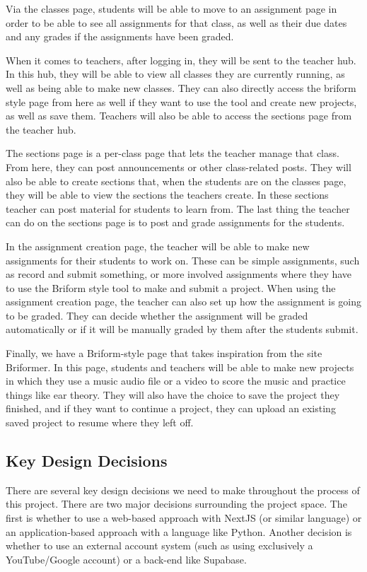 \documentclass[12pt, letterpaper]{article}
\begin{document}
Via the classes page, students will be able to move to an assignment page in order to be able to see all assignments for that class, as well as their due dates and any grades if the assignments have been graded.

When it comes to teachers, after logging in, they will be sent to the teacher hub. In this hub, they will be able to view all classes they are currently running, as well as being able to make new classes. They can also directly access the briform style page from here as well if they want to use the tool and create new projects, as well as save them. Teachers will also be able to access the sections page from the teacher hub.

The sections page is a per-class page that lets the teacher manage that class. From here, they can post announcements or other class-related posts. They will also be able to create sections that, when the students are on the classes page, they will be able to view the sections the teachers create. In these sections teacher can post material for students to learn from. The last thing the teacher can do on the sections page is to post and grade assignments for the students.

In the assignment creation page, the teacher will be able to make new assignments for their students to work on. These can be simple assignments, such as record and submit something, or more involved assignments where they have to use the Briform style tool to make and submit a project. When using the assignment creation page, the teacher can also set up how the assignment is going to be graded. They can decide whether the assignment will be graded automatically or if it will be manually graded by them after the students submit.

Finally, we have a Briform-style page that takes inspiration from the site Briformer. In this page, students and teachers will be able to make new projects in which they use a music audio file or a video to score the music and practice things like ear theory. They will also have the choice to save the project they finished, and if they want to continue a project, they can upload an existing saved project to resume where they left off.

\subsection*{Key Design Decisions}
There are several key design decisions we need to make throughout the process of this project. There are two major decisions surrounding the project space. The first is whether to use a web-based approach with NextJS (or similar language) or an application-based approach with a language like Python. Another decision is whether to use an external account system (such as using exclusively a YouTube/Google account) or a back-end like Supabase.
\end{document}
